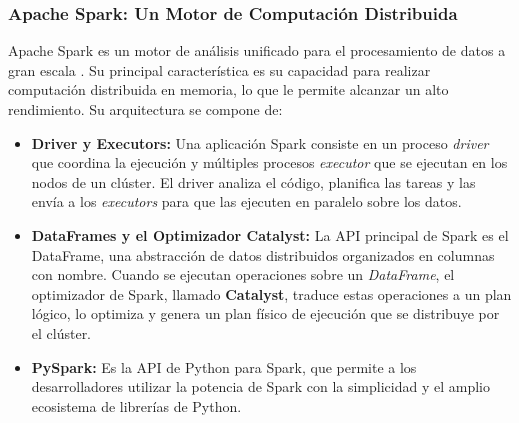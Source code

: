 \subsubsection{Apache Spark: Un Motor de Computación Distribuida}
Apache Spark es un motor de análisis unificado para el procesamiento de datos a gran escala \cite{SparkWebDoc}. Su principal característica es su capacidad para realizar computación distribuida en memoria, lo que le permite alcanzar un alto rendimiento. Su arquitectura se compone de:
\begin{itemize}
    \item \textbf{Driver y Executors:} Una aplicación Spark consiste en un proceso \textit{driver} que coordina la ejecución y múltiples procesos \textit{executor} que se ejecutan en los nodos de un clúster. El driver analiza el código, planifica las tareas y las envía a los \textit{executors} para que las ejecuten en paralelo sobre los datos.
    \item \textbf{DataFrames y el Optimizador Catalyst:} La API principal de Spark es el DataFrame, una abstracción de datos distribuidos organizados en columnas con nombre. Cuando se ejecutan operaciones sobre un \textit{DataFrame}, el optimizador de Spark, llamado \textbf{Catalyst}, traduce estas operaciones a un plan lógico, lo optimiza y genera un plan físico de ejecución que se distribuye por el clúster.
    \item \textbf{PySpark:} Es la API de Python para Spark, que permite a los desarrolladores utilizar la potencia de Spark con la simplicidad y el amplio ecosistema de librerías de Python.
\end{itemize}

